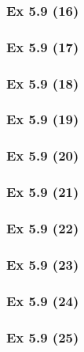\subsubsection{Ex 5.9 (16)}\label{sec:Ex_5.9.16}

\subsubsection{Ex 5.9 (17)}\label{sec:Ex_5.9.17}

\subsubsection{Ex 5.9 (18)}\label{sec:Ex_5.9.18}

\subsubsection{Ex 5.9 (19)}\label{sec:Ex_5.9.19}

\subsubsection{Ex 5.9 (20)}\label{sec:Ex_5.9.20}

\newpage		%

\subsubsection{Ex 5.9 (21)}\label{sec:Ex_5.9.21}

\subsubsection{Ex 5.9 (22)}\label{sec:Ex_5.9.22}

\subsubsection{Ex 5.9 (23)}\label{sec:Ex_5.9.23}

\subsubsection{Ex 5.9 (24)}\label{sec:Ex_5.9.24}

\subsubsection{Ex 5.9 (25)}\label{sec:Ex_5.9.25}


